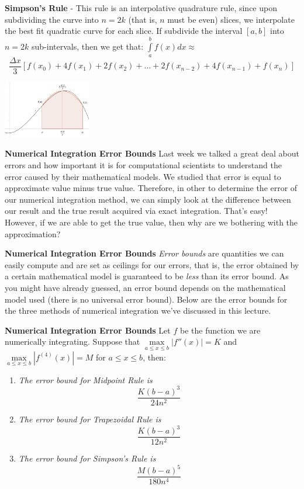 \documentclass[xcolor=dvipsnames]{beamer}
\begin{document}
\begin{frame}[fragile]
{\bf Simpson's Rule}
\Homer - This rule is an interpolative quadrature rule, since upon subdividing the curve into $n = 2k$ (that is, $n$ must be even) slices, we interpolate the best fit quadratic curve for each slice. 
\vfill \pause
If subdivide the interval $[a,b]$ into $n = 2k$ sub-intervals, then we get that: $\int\limits_a^b f(x) dx \approx $ 
\[\frac{\Delta x}{3}[f(x_0) + 4f(x_1) + 2f(x_2) + ... + 2f(x_{n-2}) + 4f(x_{n-1}) + f(x_n)] \]
\begin{center}
\includegraphics[width=1.5in]{SimpsonRule.png}
\end{center}
\end{frame}

\begin{frame}[fragile]
{\bf Numerical Integration Error Bounds}
Last week we talked a great deal about errors and how important it is for computational scientists to understand the error caused by their mathematical models. 
\vfill \pause
We studied that error is equal to approximate value minus true value. Therefore, in other to determine the error of our numerical integration method, we can simply look at the difference between our result and the true result acquired via exact integration. That's easy! 
\vfill \pause
However, if we are able to get the true value, then why are we bothering with the approximation? \\
\end{frame}

\begin{frame}[fragile]
{\bf Numerical Integration Error Bounds}
\emph{Error bounds} are quantities we can easily compute and are set as ceilings for our errors, that is, the error obtained by a certain mathematical model is guaranteed to be \emph{less} than its error bound. As you might have already guessed, an error bound depends on the mathematical model used (there is no universal error bound).
\vfill \pause
Below are the error bounds for the three methods of numerical integration we've discussed in this lecture.
\end{frame}

\begin{frame}[fragile]
{\bf Numerical Integration Error Bounds}
Let $f$ be the function we are numerically integrating. Suppose that $\max\limits_{a \leq x \leq b}|f''(x)| = K$ and $\max\limits_{a \leq x \leq b}|f^{(4)}(x)| = M$ for $a \leq x \leq b$, then:
\vfill \pause
\begin{enumerate}
\item \emph{The error bound for Midpoint Rule is}
\[\frac{K(b-a)^3}{24n^2}\] \pause
\item \emph{The error bound for Trapezoidal Rule is}
\[\frac{K(b-a)^3}{12n^2}\] \pause
\item \emph{The error bound for Simpson's Rule is}
\[\frac{M(b-a)^5}{180n^4}\]
\end{enumerate}
\end{frame}
\end{document}

